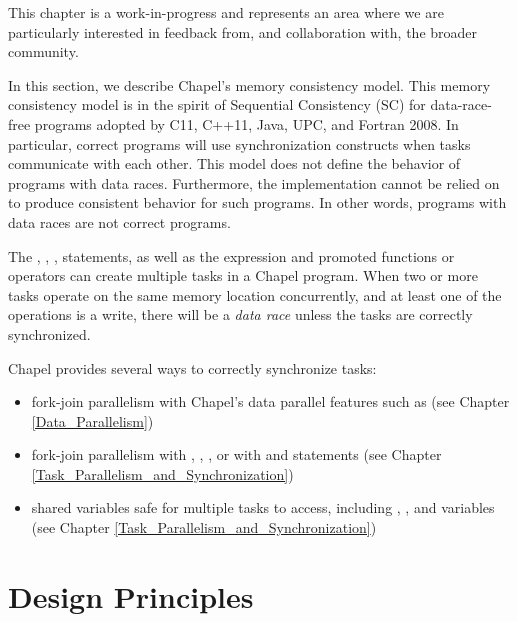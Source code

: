 \label{Memory_Consistency_Model}

\begin{openissue}
  This chapter is a work-in-progress and represents an area where we
  are particularly interested in feedback from, and collaboration
  with, the broader community.
\end{openissue}

In this section, we describe Chapel's memory consistency model. This memory
consistency model is in the spirit of Sequential Consistency (SC) for
data-race-free programs adopted by C11, C++11, Java, UPC, and Fortran 2008. In
particular, correct programs will use synchronization constructs when tasks
communicate with each other. This model does not define the behavior of
programs with
data races. Furthermore, the implementation cannot be relied on to produce
consistent behavior for such programs. In other words, programs with data
races are not correct programs.

The , , , 
statements, as well as
the  expression and promoted functions or operators can
create multiple tasks in a Chapel program. When two or more tasks operate on
the same memory location concurrently, and at least one of the operations is a
write, there will be a \textit{data race} unless the tasks are correctly
synchronized.

Chapel provides several ways to correctly synchronize tasks:

\begin{itemize}

  \item fork-join parallelism with Chapel's data parallel features such as
   (see Chapter \ref{Data_Parallelism})

  \item fork-join parallelism with , ,
  , or with  and  statements (see
  Chapter \ref{Task_Parallelism_and_Synchronization})


  \item shared variables safe for multiple tasks to access, including
  , , and  variables (see Chapter
  \ref{Task_Parallelism_and_Synchronization})

\end{itemize}

\section{Design Principles}

